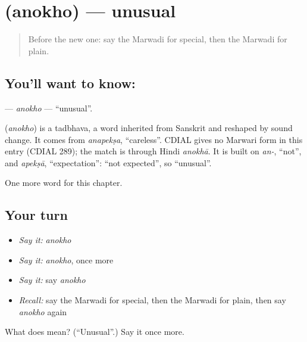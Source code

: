 \section[\texorpdfstring{\mw{अनोखो} (anokho)}{अनोखो (anokho)}]{ (anokho) — unusual}

\label{lesson:MW-C148-anokho}



\begin{quote}
Before the new one: say the Marwadi for special, then the Marwadi for plain.
\end{quote}

\subsection*{You'll want to know: }
\textbf{} — \emph{anokho} — \textquotedblleft{}unusual\textquotedblright{}.

\begin{cousinweb}
\textbf{} (\emph{anokho}) is a tadbhava, a word inherited from Sanskrit and reshaped by sound change. It comes from \emph{anapekṣa}, \textquotedblleft{}careless\textquotedblright{}. CDIAL gives no Marwari form in this entry (CDIAL 289); the match is through Hindi \emph{anokhā}. It is built on \emph{an-}, \textquotedblleft{}not\textquotedblright{}, and \emph{apekṣā}, \textquotedblleft{}expectation\textquotedblright{}: \textquotedblleft{}not expected\textquotedblright{}, so \textquotedblleft{}unusual\textquotedblright{}.
\end{cousinweb}

\begin{grammarlens}[title={What you've built}]
One more word for this chapter.
\end{grammarlens}

\subsection*{Your turn}
\begin{itemize}
\raggedright
  \item \emph{Say it:} \emph{anokho}
  \item \emph{Say it:} \emph{anokho}, once more
  \item \emph{Say it:} say \emph{anokho}
  \item \emph{Recall:} say the Marwadi for special, then the Marwadi for plain, then say \emph{anokho} again
\end{itemize}

\begin{tcolorbox}[breakable,colback=teal!4,colframe=teal!35!black,title={Before you move on}]
What does  mean? (\textquotedblleft{}Unusual\textquotedblright{}.) Say it once more.
\end{tcolorbox}

